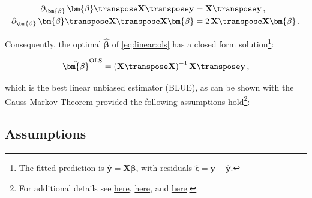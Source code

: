 \begin{subequations} \label{eq:grad_relations}
\begin{align}
\partial_{\bm{\beta}} \, \bm{\beta}\transpose \mathbf{X}\transpose \mathbf{y} &= \mathbf{X}\transpose \mathbf{y}\,, \label{eq:grad_relations:1} \\
\partial_{\bm{\beta}} \, \bm{\beta}\transpose \mathbf{X}\transpose \mathbf{X} \bm{\beta} &= 2 \, \mathbf{X} \transpose \mathbf{X} \bm{\beta}\,. \label{eq:grad_relations:2}
\end{align}
\end{subequations}

Consequently, the optimal $\hat{\bm{\beta}}$ of \cref{eq:linear:ols}
has a closed form solution\footnote{The fitted prediction is $\hat{\mathbf{y}} = \mathbf{X} \hat{\bm{\beta}}$, with residuals $\hat{\bm{\epsilon}} = \mathbf{y} - \hat{\mathbf{y}}$.}:

\begin{equation}\label{eq:linear:betahat_OLS}
\hat{\bm{\beta}}^{\text{OLS}} = \left(\mathbf{X}\transpose\mathbf{X}\right)^{-1}\mathbf{X}\transpose \mathbf{y}\,,
\end{equation}

\noindent which is the best linear unbiased estimator (BLUE),
as can be shown with the Gauss-Markov Theorem provided
the following assumptions hold\footnote{For additional details see
\href{https://economictheoryblog.com/2015/04/01/ols_assumptions/}{here},
\href{http://people.duke.edu/~rnau/testing.htm}{here}, and
\href{https://economictheoryblog.com/2015/02/26/markov_theorem/}{here}.}:

\subsection{Assumptions}
\label{regression:linear:assumptions}

